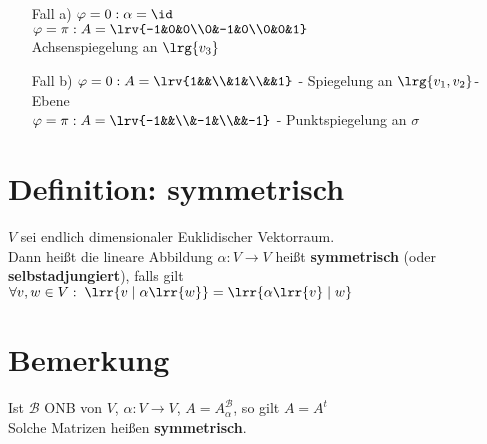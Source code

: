 	\begin{enumerate}[a)]
		\item[Fall a)] $\varphi=0 : \alpha=\id$\\
			$\varphi=\pi: A=\lrv{-1&0&0\\0&-1&0\\0&0&1}$\\
			Achsenspiegelung an $\lrg{v_3}$
		\item[Fall b)] $\varphi=0 : A=\lrv{1&&\\&1&\\&&1}$ - Spiegelung an $\lrg{v_1,v_2}$-Ebene\\
			$\varphi=\pi : A=\lrv{-1&&\\&-1&\\&&-1}$ - Punktspiegelung an $\sigma$
	\end{enumerate}

\section{Definition: symmetrisch}
	$V$ sei endlich dimensionaler Euklidischer Vektorraum.\\
	Dann heißt die lineare Abbildung $\alpha:V\rightarrow V$ heißt \textbf{symmetrisch} (oder \textbf{selbstadjungiert}), falls gilt $\forall v,w\in V:\;\lrr{v\mid\alpha\lrr{w}}=\lrr{\alpha\lrr{v}\mid w}$

\section{Bemerkung}
	Ist $\mathcal{B}$ ONB von $V$, $\alpha:V\rightarrow V$, $A=A_\alpha^{\mathcal{B}}$, so gilt $A=A^t$\\
	Solche Matrizen heißen \textbf{symmetrisch}.

